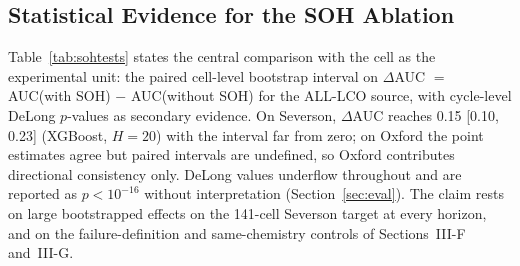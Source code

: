 \subsection{Statistical Evidence for the SOH Ablation}
Table~\ref{tab:sohtests} states the central comparison with the cell as the experimental unit: the paired cell-level bootstrap interval on $\Delta$AUC $=$ AUC(with SOH) $-$ AUC(without SOH) for the ALL-LCO source, with cycle-level DeLong $p$-values as secondary evidence. On Severson, $\Delta$AUC reaches 0.15 [0.10, 0.23] (XGBoost, $H{=}20$) with the interval far from zero; on Oxford the point estimates agree but paired intervals are undefined, so Oxford contributes directional consistency only. DeLong values underflow throughout and are reported as $p{<}10^{-16}$ without interpretation (Section~\ref{sec:eval}). The claim rests on large bootstrapped effects on the 141-cell Severson target at every horizon, and on the failure-definition and same-chemistry controls of Sections~III-F and~III-G.

